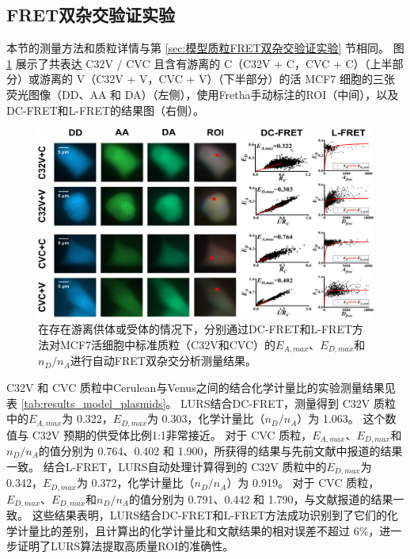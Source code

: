 \subsection{FRET双杂交验证实验}
本节的测量方法和质粒详情与第 \ref{sec:模型质粒FRET双杂交验证实验} 节相同。
图 \ref{fig:results_model_plasmids} 展示了共表达 C32V / CVC 且含有游离的 C（C32V + C，CVC + C）（上半部分）或游离的 V（C32V + V，CVC + V）（下半部分）的活 MCF7 细胞的三张荧光图像（DD、AA 和 DA）（左侧），使用Fretha手动标注的ROI（中间），以及DC-FRET和L-FRET的结果图（右侧）。
\begin{figure}[htbp]
    \centering
    \includegraphics[width=1\linewidth]{../figures/4/LURS结果-模型质粒.drawio.png}
    \caption[模型质粒验证实验结果]{在存在游离供体或受体的情况下，分别通过DC-FRET和L-FRET方法对MCF7活细胞中标准质粒（C32V和CVC）的$E_{A, max}$、$E_{D, max}$和$n_D/n_A$进行自动FRET双杂交分析测量结果。}
    \label{fig:results_model_plasmids}
\end{figure}

C32V 和 CVC 质粒中Cerulean与Venus之间的结合化学计量比的实验测量结果见表 \ref{tab:results_model_plasmids}。
LURS结合DC-FRET，测量得到 C32V 质粒中的$E_{A,max}$为 0.322，$E_{D,max}$为 0.303，化学计量比（$n_D/n_A$）为 1.063。
这个数值与 C32V 预期的供受体比例1:1非常接近。
对于 CVC 质粒，$E_{A,max}$、$E_{D,max}$和$n_D/n_A$的值分别为 0.764、0.402 和 1.900，所获得的结果与先前文献中报道的结果一致。
结合L-FRET，LURS自动处理计算得到的 C32V 质粒中的$E_{D,max}$为 0.342，$E_{D,max}$为 0.372，化学计量比（$n_D/n_A$）为 0.919。
对于 CVC 质粒，$E_{D,max}$、$E_{D,max}$和$n_D/n_A$的值分别为 0.791、0.442 和 1.790，与文献报道的结果一致。
这些结果表明，LURS结合DC-FRET和L-FRET方法成功识别到了它们的化学计量比的差别，且计算出的化学计量比和文献结果的相对误差不超过 6\%，进一步证明了LURS算法提取高质量ROI的准确性。

